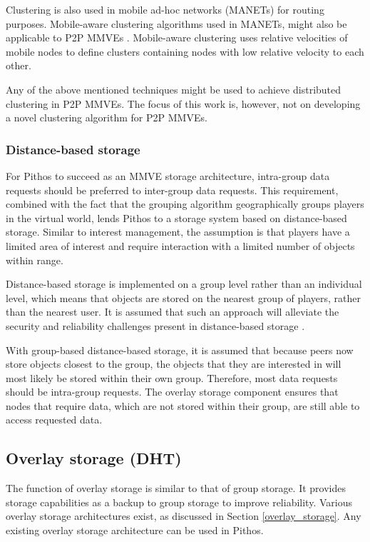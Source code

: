 Clustering is also used in mobile ad-hoc networks (MANETs) for routing purposes. Mobile-aware clustering algorithms used in MANETs, might also be applicable to P2P MMVEs \cite{clustering_survey}. Mobile-aware clustering uses relative velocities of mobile nodes to define clusters containing nodes with low relative velocity to each other.

Any of the above mentioned techniques might be used to achieve distributed clustering in P2P MMVEs. The focus of this work is, however, not on developing a novel clustering algorithm for P2P MMVEs.

\subsubsection{Distance-based storage}
\label{distance_based_design}

For Pithos to succeed as an MMVE storage architecture, intra-group data requests should be preferred to inter-group data requests. This requirement, combined with the fact that the grouping algorithm geographically groups players in the virtual world, lends Pithos to a storage system based on distance-based storage. Similar to interest management, the assumption is that players have a limited area of interest and require interaction with a limited number of objects within range.

Distance-based storage is implemented on a group level rather than an individual level, which means that objects are stored on the nearest group of players, rather than the nearest user. It is assumed that such an approach will alleviate the security and reliability challenges present in distance-based storage \cite{gilmore_p2p_mmog_state_persistency}.

With group-based distance-based storage, it is assumed that because peers now store objects closest to the group, the objects that they are interested in will most likely be stored within their own group. Therefore, most data requests should be intra-group requests. The overlay storage component ensures that nodes that require data, which are not stored within their group, are still able to access requested data.

\subsection{Overlay storage (DHT)}

The function of overlay storage is similar to that of group storage. It provides storage capabilities as a backup to group storage to improve reliability. Various overlay storage architectures exist, as discussed in Section \ref{overlay_storage}. Any existing overlay storage architecture can be used in Pithos.


